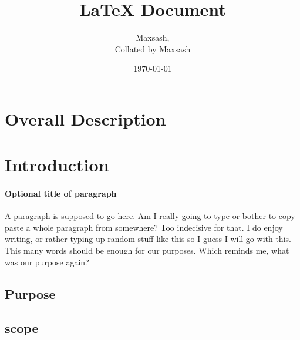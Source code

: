 \documentclass{article}
\title{LaTeX Document}
\author{Maxsash, \\Collated by Maxsash} %
\date{\today}
\begin{document}
	\maketitle
	\tableofcontents


	\section{Overall Description}
	
	\section{Introduction}
	\paragraph{Optional title of paragraph}
	A paragraph is supposed to go here. Am I really going to type or bother to copy paste a whole paragraph from somewhere? Too indecisive for that. I do enjoy writing, or rather typing up random stuff like this so I guess I will go with this. This many words should be enough for our purposes. Which reminds me, what was our purpose again?

	\subsection{Purpose}

	\subsection{scope}
\end{document}
